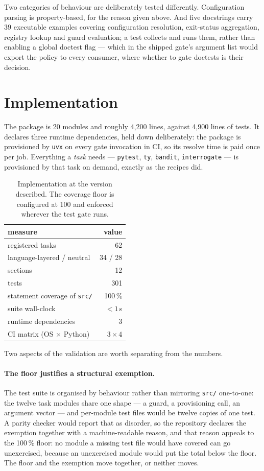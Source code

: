 \documentclass[11pt,a4paper]{article}
\begin{document}
Two categories of behaviour are deliberately tested differently. Configuration parsing is
property-based, for the reason given above. And five docstrings carry 39 executable
examples covering configuration resolution, exit-status aggregation, registry lookup and
guard evaluation; a test collects and runs them, rather than enabling a global doctest flag
--- which in the shipped gate's argument list would export the policy to every consumer,
where whether to gate doctests is their decision.

\section{Implementation}
\label{sec:impl}

The package is 20 modules and roughly 4{,}200 lines, against 4{,}900 lines of tests. It
declares three runtime dependencies, held down deliberately: the package is provisioned by
\texttt{uvx} on every gate invocation in CI, so its resolve time is paid once per job.
Everything a \emph{task} needs --- \texttt{pytest}, \texttt{ty}, \texttt{bandit},
\texttt{interrogate} --- is provisioned by that task on demand, exactly as the recipes did.

\begin{table}[ht]
\centering
\begin{tabular}{@{}lr@{}}
\toprule
measure & value \\
\midrule
registered tasks & 62 \\
\quad language-layered / neutral & 34 / 28 \\
sections & 12 \\
tests & 301 \\
statement coverage of \texttt{src/} & 100\,\% \\
suite wall-clock & $<1$\,s \\
runtime dependencies & 3 \\
CI matrix (OS $\times$ Python) & $3 \times 4$ \\
\bottomrule
\end{tabular}
\caption{Implementation at the version described. The coverage floor is configured at 100
and enforced wherever the test gate runs.}
\label{tab:impl}
\end{table}

Two aspects of the validation are worth separating from the numbers.

\paragraph{The floor justifies a structural exemption.} The test suite is organised by
behaviour rather than mirroring \texttt{src/} one-to-one: the twelve task modules share one
shape --- a guard, a provisioning call, an argument vector --- and per-module test files
would be twelve copies of one test. A parity checker would report that as disorder, so the
repository declares the exemption together with a machine-readable reason, and that reason
appeals to the 100\,\% floor: no module a missing test file would have covered can go
unexercised, because an unexercised module would put the total below the floor. The floor
and the exemption move together, or neither moves.
\end{document}

